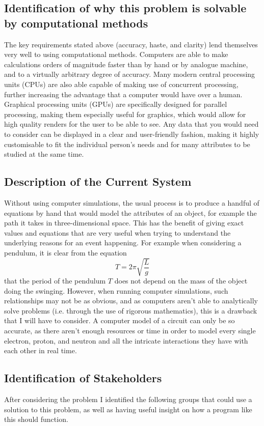 \documentclass[11pt]{article}
\begin{document}
        \subsection{Identification of why this problem is solvable by computational methods}
            The key requirements stated above (accuracy, haste, and clarity) lend themselves very well to using computational methods. Computers are able to make calculations orders of magnitude faster than by hand or by analogue machine, and to a virtually arbitrary degree of accuracy. Many modern central processing units (CPUs) are also able capable of making use of concurrent processing, further increasing the advantage that a computer would have over a human. Graphical processing units (GPUs) are specifically designed for parallel processing, making them especially useful for graphics, which would allow for high quality renders for the user to be able to see. Any data that you would need to consider can be displayed in a clear and user-friendly fashion, making it highly customisable to fit the individual person's needs and for many attributes to be studied at the same time.

        \subsection{Description of the Current System}
            Without using computer simulations, the usual process is to produce a handful of equations by hand that would model the attributes of an object, for example the path it takes in three-dimensional space. This has the benefit of giving exact values and equations that are very useful when trying to understand the underlying reasons for an event happening. For example when considering a pendulum, it is clear from the equation $$ T = 2 \pi \sqrt{\frac{L}{g}} $$ that the period of the pendulum $T$ does not depend on the mass of the object doing the swinging. However, when running computer simulations, such relationships may not be as obvious, and as computers aren't able to analytically solve problems (i.e. through the use of rigorous mathematics), this is a drawback that I will have to consider. A computer model of a circuit can only be so accurate, as there aren't enough resources or time in order to model every single electron, proton, and neutron and all the intricate interactions they have with each other in real time.
            
        \subsection{Identification of Stakeholders}
            After considering the problem I identified the following groups that could use a solution to this problem, as well as having useful insight on how a program like this should function.
\end{document}
